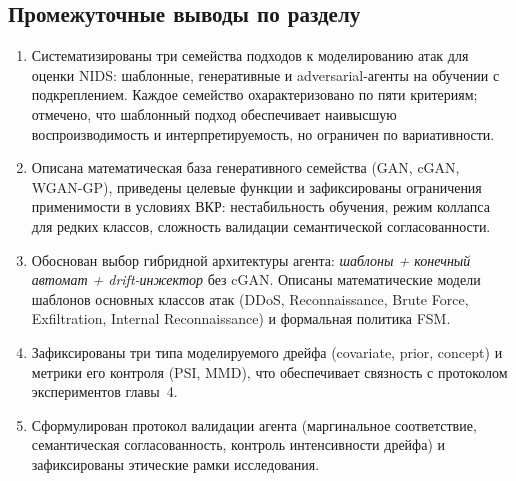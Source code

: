 \subsection{Промежуточные выводы по разделу}

\begin{enumerate}
    \item Систематизированы три семейства подходов к моделированию атак
    для оценки NIDS: шаблонные, генеративные и adversarial-агенты на
    обучении с подкреплением. Каждое семейство охарактеризовано по пяти
    критериям; отмечено, что шаблонный подход обеспечивает наивысшую
    воспроизводимость и интерпретируемость, но ограничен по вариативности.
    \item Описана математическая база генеративного семейства (GAN, cGAN,
    WGAN-GP), приведены целевые функции и зафиксированы ограничения
    применимости в условиях ВКР: нестабильность обучения, режим коллапса
    для редких классов, сложность валидации семантической согласованности.
    \item Обоснован выбор гибридной архитектуры агента: \emph{шаблоны +
    конечный автомат + drift-инжектор} без cGAN. Описаны математические
    модели шаблонов основных классов атак (DDoS, Reconnaissance, Brute Force,
    Exfiltration, Internal Reconnaissance) и формальная политика FSM.
    \item Зафиксированы три типа моделируемого дрейфа (covariate, prior,
    concept) и метрики его контроля (PSI, MMD), что обеспечивает связность
    с протоколом экспериментов главы~4.
    \item Сформулирован протокол валидации агента (маргинальное соответствие,
    семантическая согласованность, контроль интенсивности дрейфа) и
    зафиксированы этические рамки исследования.
\end{enumerate}
